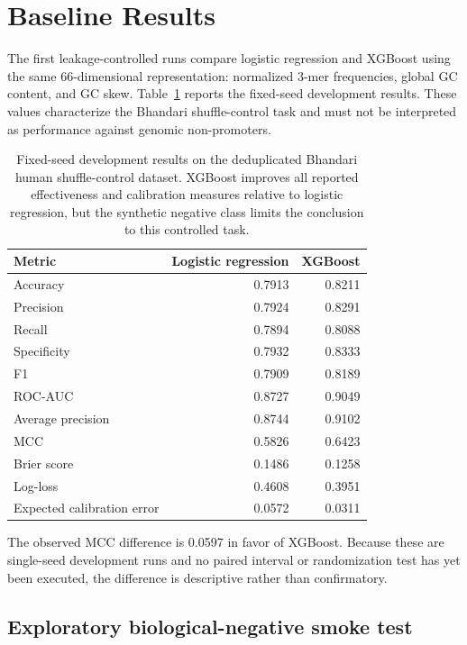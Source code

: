 \section{Baseline Results}\label{sec:results-baselines}

The first leakage-controlled runs compare logistic regression and XGBoost using
the same 66-dimensional representation: normalized 3-mer frequencies, global
GC content, and GC skew. Table~\ref{tab:results-bhandari-shuffle-baselines}
reports the fixed-seed development results. These values characterize the
Bhandari shuffle-control task and must not be interpreted as performance against
genomic non-promoters.

\begin{table}[htbp]
  \centering
  \caption{Fixed-seed development results on the deduplicated Bhandari human shuffle-control dataset. XGBoost improves all reported effectiveness and calibration measures relative to logistic regression, but the synthetic negative class limits the conclusion to this controlled task.}
  \label{tab:results-bhandari-shuffle-baselines}
  \begin{tabular}{lrr}
    \toprule
    Metric & Logistic regression & XGBoost \\
    \midrule
    Accuracy & 0.7913 & 0.8211 \\
    Precision & 0.7924 & 0.8291 \\
    Recall & 0.7894 & 0.8088 \\
    Specificity & 0.7932 & 0.8333 \\
    F1 & 0.7909 & 0.8189 \\
    ROC-AUC & 0.8727 & 0.9049 \\
    Average precision & 0.8744 & 0.9102 \\
    MCC & 0.5826 & 0.6423 \\
    Brier score & 0.1486 & 0.1258 \\
    Log-loss & 0.4608 & 0.3951 \\
    Expected calibration error & 0.0572 & 0.0311 \\
    \bottomrule
  \end{tabular}
\end{table}

The observed MCC difference is 0.0597 in favor of XGBoost. Because these are
single-seed development runs and no paired interval or randomization test has
yet been executed, the difference is descriptive rather than confirmatory.

\subsection{Exploratory biological-negative smoke test}

